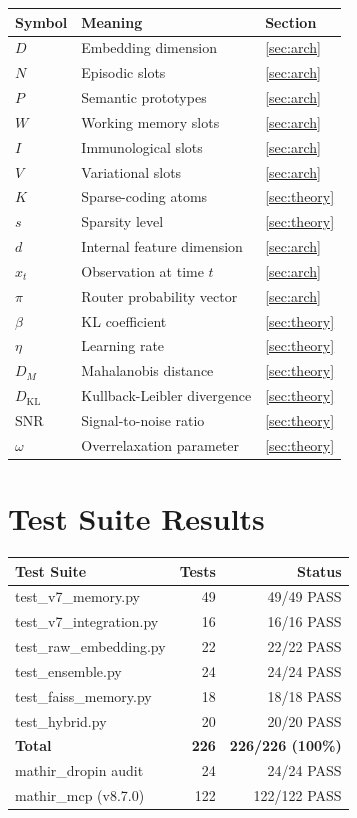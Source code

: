 \documentclass[12pt,a4paper]{article}
\theoremstyle{definition}
\theoremstyle{remark}
\newcommand{\KL}{D_{\mathrm{KL}}}
\newcommand{\SNR}{\mathrm{SNR}}
\begin{document}
\begin{table}[H]
\centering
\begin{tabular}{lll}
\toprule
\textbf{Symbol} & \textbf{Meaning} & \textbf{Section} \\
\midrule
$D$ & Embedding dimension & \ref{sec:arch} \\
$N$ & Episodic slots & \ref{sec:arch} \\
$P$ & Semantic prototypes & \ref{sec:arch} \\
$W$ & Working memory slots & \ref{sec:arch} \\
$I$ & Immunological slots & \ref{sec:arch} \\
$V$ & Variational slots & \ref{sec:arch} \\
$K$ & Sparse-coding atoms & \ref{sec:theory} \\
$s$ & Sparsity level & \ref{sec:theory} \\
$d$ & Internal feature dimension & \ref{sec:arch} \\
$x_t$ & Observation at time $t$ & \ref{sec:arch} \\
$\pi$ & Router probability vector & \ref{sec:arch} \\
$\beta$ & KL coefficient & \ref{sec:theory} \\
$\eta$ & Learning rate & \ref{sec:theory} \\
$D_M$ & Mahalanobis distance & \ref{sec:theory} \\
$\KL$ & Kullback-Leibler divergence & \ref{sec:theory} \\
$\SNR$ & Signal-to-noise ratio & \ref{sec:theory} \\
$\omega$ & Overrelaxation parameter & \ref{sec:theory} \\
\bottomrule
\end{tabular}
\end{table}

\section{Test Suite Results}
\label{app:tests}

\begin{table}[H]
\centering
\begin{tabular}{lrr}
\toprule
\textbf{Test Suite} & \textbf{Tests} & \textbf{Status} \\
\midrule
test\_v7\_memory.py & 49 & 49/49 PASS \\
test\_v7\_integration.py & 16 & 16/16 PASS \\
test\_raw\_embedding.py & 22 & 22/22 PASS \\
test\_ensemble.py & 24 & 24/24 PASS \\
test\_faiss\_memory.py & 18 & 18/18 PASS \\
test\_hybrid.py & 20 & 20/20 PASS \\
\midrule
\textbf{Total} & \textbf{226} & \textbf{226/226 (100\%)} \\
\midrule
mathir\_dropin audit & 24 & 24/24 PASS \\
mathir\_mcp (v8.7.0) & 122 & 122/122 PASS \\
\bottomrule
\end{tabular}
\end{table}
\end{document}
